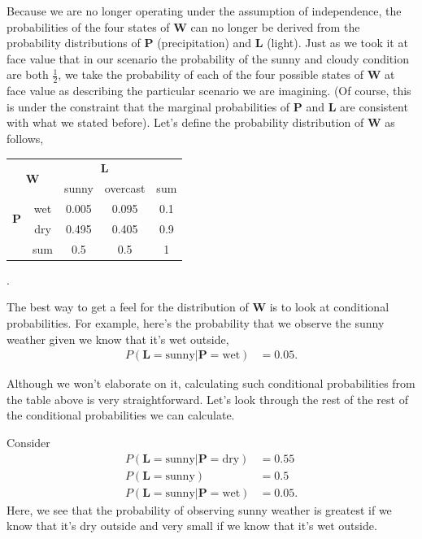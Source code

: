 Because we are no longer operating under the assumption of independence, the probabilities of the four states of $\bm{W}$ can no longer be derived from the probability distributions of $\bm{P}$ (precipitation) and $\bm{L}$ (light).
Just as we took it at face value that in our scenario the probability of the sunny and cloudy condition are both $\frac{1}{2}$, we take the probability of each of the four possible states of $\bm{W}$ at face value as describing the particular scenario we are imagining.
(Of course, this is under the constraint that the marginal probabilities of $\bm{P}$ and $\bm{L}$ are consistent with what we stated before).
Let's define the probability distribution of $\bm{W}$ as follows,
\begin{center}
 \begin{tabular}{c c || c | c || c}
 \multicolumn{2}{c}{\multirow{2}{*}{$\bm{W}$}} & \multicolumn{2}{c}{$\bm{L}$} & {}\\
\multicolumn{2}{c}{} & sunny & overcast & sum \\ [0.5ex]
 \hline\hline
\multirow{2}{*}{$\bm{P}$} & wet & 0.005 & 0.095 & 0.1 \\
 \cline{2-5}
 & dry & 0.495 & 0.405 & 0.9 \\
 \hline\hline
  {} & sum & 0.5 & 0.5 & 1 \\ [1ex]
\end{tabular}.
\end{center}

The best way to get a feel for the distribution of $\bm{W}$ is to look at conditional probabilities.
For example, here's the probability that we observe the sunny weather given we know that it's wet outside,
\begin{align*}
P(\bm{L} = \text{sunny} | \bm{P} = \text{wet}) &= 0.05.
\end{align*}

Although we won't elaborate on it, calculating such conditional probabilities from the table above is very straightforward.
Let's look through the rest of the rest of the conditional probabilities we can calculate.

Consider
\begin{align*}
  P(\bm{L} = \text{sunny} | \bm{P} = \text{dry}) &= 0.55 \\
  P(\bm{L} = \text{sunny}) &= 0.5 \\
  P(\bm{L} = \text{sunny} | \bm{P} = \text{wet}) &= 0.05.
\end{align*}
Here, we see that the probability of observing sunny weather is greatest if we know that it's dry outside and very small if we know that it's wet outside.


